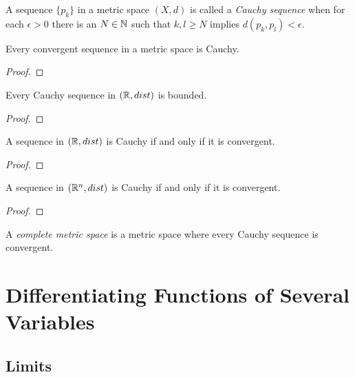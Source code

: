 \documentclass[letterpaper, twoside, 12pt]{book}
\begin{document}
\begin{definition}
  A sequence \(\{p_k\}\) in a metric space \((X,d)\) is called a
  \textit{Cauchy sequence} when for each \(\epsilon>0\) there is an
  \(N\in\mathbb N\) such that \(k,l\geq N\) implies \(d(p_k,p_l)<\epsilon\).
\end{definition}

\begin{proposition}[12.15]
  Every convergent sequence in a metric space is Cauchy.
\end{proposition}
\begin{proof}

\end{proof}

\begin{lemma}[9.3]
  Every Cauchy sequence in \((\mathbb R,dist)\) is bounded.
\end{lemma}
\begin{proof}

\end{proof}

\begin{theorem}[9.4]
  A sequence in \((\mathbb R,dist)\) is Cauchy if and only if it is convergent.
\end{theorem}
\begin{proof}

\end{proof}

\begin{corollary}[Example 12.16]
  A sequence in \((\mathbb R^n,dist)\) is Cauchy if and only if it is convergent.
\end{corollary}
\begin{proof}

\end{proof}

\begin{definition}
  A \textit{complete metric space} is a metric space where every
  Cauchy sequence is convergent.
\end{definition}




\chapter{Differentiating Functions of Several Variables}


\section{Limits}
\end{document}
